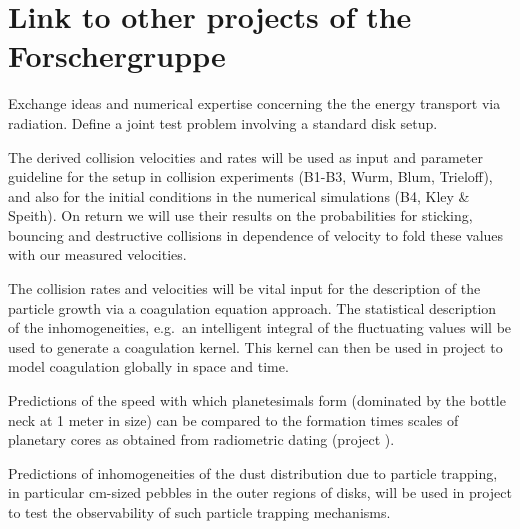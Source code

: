 \section{Link to other projects of the Forschergruppe}
\begin{linkproj}
\item[\projtscharn{}] Exchange ideas and numerical expertise concerning the
the energy transport via radiation. Define a joint test problem involving a
standard disk setup.
\item[\blockimpact{}] The derived collision velocities and rates will be
used as input and parameter guideline for the setup in
collision experiments (B1-B3, Wurm, Blum, Trieloff), and also for
the initial conditions in the numerical simulations (B4, Kley \& Speith).
On return we will use their results on the probabilities for sticking,
bouncing and destructive collisions in dependence of velocity to
fold these values with our measured velocities. 
%
\item[\projdul{}] The collision rates and velocities will be vital input for
the description of the particle growth via a coagulation equation approach.
The statistical description of the inhomogeneities, e.g.\ an intelligent
integral of the fluctuating values will be used to generate a coagulation kernel.
This kernel can then be
used in project \projdul{} to model coagulation globally in space and time.
%
\item[\projtrie{}] Predictions of the speed with which planetesimals form
(dominated by the bottle neck at 1 meter in size)
can be compared to the formation times scales of planetary cores
as obtained from radiometric dating (project \projtrie{}).
%
\item[\projwolf{}] Predictions of inhomogeneities of the dust
distribution due to particle trapping, in particular cm-sized pebbles in the
outer regions of disks, will be used in project \projwolf{} to test the
observability of such particle trapping mechanisms.
\end{linkproj}
%
